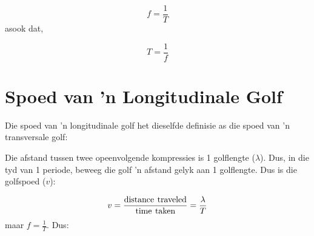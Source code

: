     \begin{equation}
    f=\frac{1}{T}
      \end{equation}
        \label{m38782*id291706}asook dat,\par 
        \label{m38782*id292764}\nopagebreak\noindent{}
    \begin{equation}
    T=\frac{1}{f}
      \end{equation}
      \label{m38782*uid11}
            \section{Spoed van  'n Longitudinale Golf}
            \nopagebreak
            \label{m38782*id292794}Die spoed van  'n longitudinale golf het dieselfde definisie as die spoed van  'n transversale golf:\par
%           

   
        \label{m38806*id319706}Die afstand tussen twee opeenvolgende kompressies is 1 golflengte ($\lambda$). Dus, in die tyd van 1 periode, beweeg die golf  'n afstand gelyk aan 1 golflengte. Dus is die golfspoed ($v$):\par 
        \label{m38806*id319732}\nopagebreak\noindent{}
    \begin{equation}
    v=\frac{\text{distance}\phantom{\rule{4.pt}{0ex}}\text{traveled}}{\text{time}\phantom{\rule{4.pt}{0ex}}\text{taken}}=\frac{\lambda }{T}
      \end{equation}
        \label{m38806*id319776}maar $f=\frac{1}{T}$. Dus:\par 
        \label{m38806*id319802}\nopagebreak\noindent{}
          
